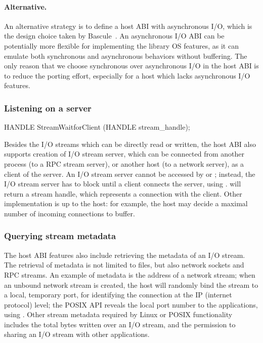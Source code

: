 \paragraph{Alternative.}
An alternative strategy is to define a host ABI with asynchronous I/O,
which is the design choice taken by Bascule~\cite{baumann13bascule}.
An asynchronous I/O ABI can be potentially
more flexible for implementing the library OS features,
as it can emulate both synchronous and asynchronous behaviors
without buffering.
The only reason that we choose synchronous over asynchronous I/O
in the host ABI is to reduce the porting effort,
especially for a host which lacks
asynchronous I/O features.



\subsubsection*{Listening on a server}


\begin{paldef}
HANDLE StreamWaitforClient (HANDLE stream_handle);
\end{paldef} 

Besides the I/O streams which can be directly read or written,
the host ABI also supports creation
of I/O stream server, which can be
connected from another process (to a RPC stream server), or another host (to a network server), as a client of the server.
An I/O stream server cannot be accessed by  or ;
instead, the I/O stream server has to block until a client
connects the server, using .
 will return a stream handle, which represents a connection with the client.
Other implementation
is up to the host: for example,
the host may decide a maximal number of incoming connections to buffer.









\subsubsection*{Querying stream metadata}

The host ABI features also include retrieving the metadata of an I/O stream.
The retrieval of metadata is not limited to files,
but also network sockets and RPC streams. %
An example of metadata is the address of a network stream;
when an unbound network stream is created,
the host will randomly bind the stream to a local, temporary port, for identifying the connection at the IP (internet protocol) level;
the POSIX API
reveals the local port number
to the applications,
using .
Other stream metadata required by Linux or POSIX functionality
includes the total bytes written over an I/O stream, and the permission to sharing an I/O stream with other applications.




